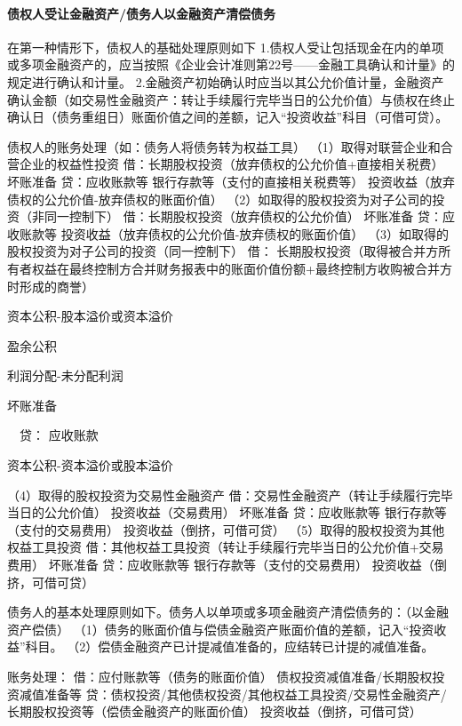\documentclass[UTF8,12pt]{ctexart}
\newenvironment{Dr}{\noindent 借：}{\par}
\newenvironment{Cr}{\noindent \ \ 贷：}{\par}
\numberwithin{equation}{section} %
\numberwithin{figure}{section}
\numberwithin{table}{section}
\begin{document}
	\paragraph{债权人受让金融资产/债务人以金融资产清偿债务}在第一种情形下，债权人的基础处理原则如下
	1.债权人受让包括现金在内的单项或多项金融资产的，应当按照《企业会计准则第22号——金融工具确认和计量》的规定进行确认和计量。
	2.金融资产初始确认时应当以其公允价值计量，金融资产确认金额（如交易性金融资产：转让手续履行完毕当日的公允价值）与债权在终止确认日（债务重组日）账面价值之间的差额，记入“投资收益”科目（可借可贷）。
	
	债权人的账务处理（如：债务人将债务转为权益工具）
	（1）取得对联营企业和合营企业的权益性投资
	借：长期股权投资（放弃债权的公允价值+直接相关税费）
	坏账准备
	贷：应收账款等
	银行存款等（支付的直接相关税费等）
	投资收益（放弃债权的公允价值-放弃债权的账面价值）
	（2）如取得的股权投资为对子公司的投资（非同一控制下）
	借：长期股权投资（放弃债权的公允价值）
	坏账准备
	贷：应收账款等
	投资收益（放弃债权的公允价值-放弃债权的账面价值）
	（3）如取得的股权投资为对子公司的投资（同一控制下）
	\begin{Dr}
		长期股权投资（取得被合并方所有者权益在最终控制方合并财务报表中的账面价值份额+最终控制方收购被合并方时形成的商誉）
		
		资本公积-股本溢价或资本溢价
		
		盈余公积
		
		利润分配-未分配利润
		
		坏账准备
	\end{Dr}
	\begin{Cr}
		应收账款
		
		资本公积-资本溢价或股本溢价
	\end{Cr}
	（4）取得的股权投资为交易性金融资产
	借：交易性金融资产（转让手续履行完毕当日的公允价值）
	投资收益（交易费用）
	坏账准备
	贷：应收账款等
	银行存款等（支付的交易费用）
	投资收益（倒挤，可借可贷）
	（5）取得的股权投资为其他权益工具投资
	借：其他权益工具投资（转让手续履行完毕当日的公允价值+交易费用）
	坏账准备
	贷：应收账款等
	银行存款等（支付的交易费用）
	投资收益（倒挤，可借可贷）
	
	债务人的基本处理原则如下。债务人以单项或多项金融资产清偿债务的：（以金融资产偿债）
	（1）债务的账面价值与偿债金融资产账面价值的差额，记入“投资收益”科目。
	（2）偿债金融资产已计提减值准备的，应结转已计提的减值准备。
	
	账务处理：
	借：应付账款等（债务的账面价值）
	债权投资减值准备/长期股权投资减值准备等
	贷：债权投资/其他债权投资/其他权益工具投资/交易性金融资产/长期股权投资等（偿债金融资产的账面价值）
	投资收益（倒挤，可借可贷）
	
\end{document}
